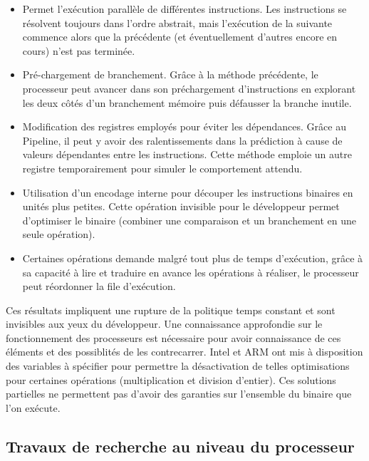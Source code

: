 \begin{itemize}
    \item[\textbf{Pipeline}] Permet l'exécution parallèle de différentes instructions. Les instructions se résolvent toujours dans l'ordre abstrait, mais l’exécution de la suivante commence alors que la précédente (et éventuellement d’autres encore en cours) n’est pas terminée.
    \item[\textbf{Prédiction de branche}] Pré-chargement de branchement. Grâce à la méthode précédente, le processeur peut avancer dans son préchargement d'instructions en explorant les deux côtés d'un branchement mémoire puis défausser la branche inutile.
    \item[\textbf{Renommage de registres}] Modification des registres employés pour éviter les dépendances. Grâce au Pipeline, il peut y avoir des ralentissements dans la prédiction à cause de valeurs dépendantes entre les instructions. Cette méthode emploie un autre registre temporairement pour simuler le comportement attendu.
    \item[\textbf{Micro-opérations}] Utilisation d'un encodage interne pour découper les instructions binaires en unités plus petites. Cette opération invisible pour le développeur permet d'optimiser le binaire (\eg combiner une comparaison et un branchement en une seule opération).
    \item[\textbf{Exécution désordonné}\footnote{Plus connus sous le terme technique de référence anglais : Out-of-order Execution}] Certaines opérations demande malgré tout plus de temps d'exécution, grâce à sa capacité à lire et traduire en avance les opérations à réaliser, le processeur peut réordonner la file d'exécution.
\end{itemize}\medbreak

Ces résultats impliquent une rupture de la politique temps constant et sont invisibles aux yeux du développeur. Une connaissance approfondie sur le fonctionnement des processeurs est nécessaire pour avoir connaissance de ces éléments et des possiblités de les contrecarrer. Intel et ARM ont mis à disposition des variables à spécifier pour permettre la désactivation de telles optimisations pour certaines opérations (multiplication et division d'entier). Ces solutions partielles ne permettent pas d'avoir des garanties sur l'ensemble du binaire que l'on exécute.

\subsection*{Travaux de recherche au niveau du processeur}

